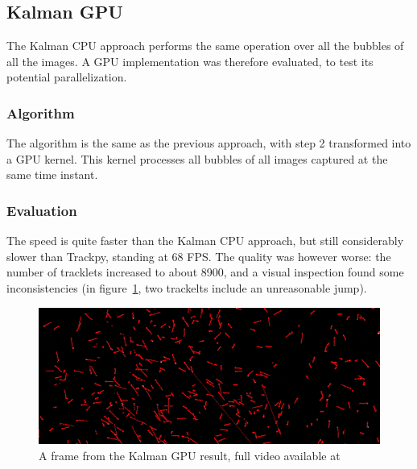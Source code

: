 \subsection{Kalman GPU}
\label{sec:link2d:kalman-gpu}

The Kalman CPU approach performs the same operation over all the bubbles of all the images.
A GPU implementation was therefore evaluated, to test its potential parallelization.

\subsubsection{Algorithm}

The algorithm is the same as the previous approach, with step 2 transformed into a GPU kernel.
This kernel processes all bubbles of all images captured at the same time instant.

\subsubsection{Evaluation}

The speed is quite faster than the Kalman CPU approach, but still considerably slower than Trackpy, standing at 68 FPS.
The quality was however worse: the number of tracklets increased to about 8900, and a visual inspection found some inconsistencies (in figure~\ref{fig:linkDD:kalmangpu}, two trackelts include an unreasonable jump).

\begin{figure}
	\centerline{\includegraphics[width=\locateimgsize]{images/link2d/kalman_GPU.png}}
	\caption{\centering A frame from the Kalman GPU \linkDD* result, full video available at~\cite{linkDD-kalman-gpu}}
	\label{fig:linkDD:kalmangpu}
\end{figure}
